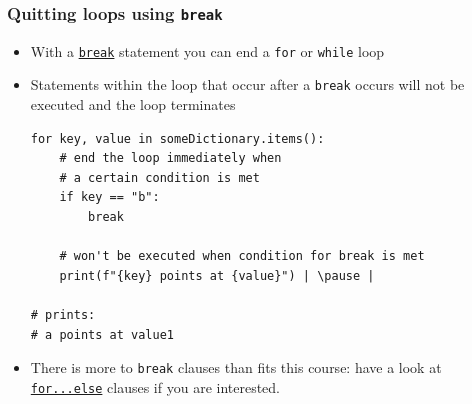 \documentclass[xcolor=table]{beamer}
\begin{document}

\begin{frame}[fragile]
\frametitle{Quitting loops using \texttt{break}}
\begin{itemize}\addtolength{\itemsep}{0.5\baselineskip}
        \item With a \href{https://docs.python.org/3/tutorial/controlflow.html?highlight=break#break-and-continue-statements-and-else-clauses-on-loops}{\texttt{break}} statement you can end a \texttt{for} or \texttt{while} loop
        \item Statements within the loop that occur after a \texttt{break} occurs will not be executed and the loop terminates
\begin{lstlisting}[style=python]
for key, value in someDictionary.items():
    # end the loop immediately when
    # a certain condition is met
    if key == "b":
        break 

    # won't be executed when condition for break is met
    print(f"{key} points at {value}") | \pause |

# prints:
# a points at value1
\end{lstlisting}
        \item There is more to \texttt{break} clauses than fits this course: have a look at \href{https://docs.python.org/3/tutorial/controlflow.html#break-and-continue-statements-and-else-clauses-on-loops}{\texttt{for...else}} clauses if you are interested.
    \end{itemize}
\end{frame}

\end{document}
